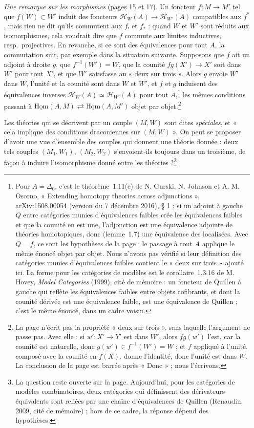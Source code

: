 \documentclass[11pt,a4paper]{article}
\begin{document}
\emph{Une remarque sur les morphismes} (pages 15 et 17). Un foncteur $f : M \to
M'$ tel que $f(W) \subset W'$ induit des foncteurs $\mathcal H_W(A) \to
\mathcal H_{W'}(A)$ compatibles aux $f^{*}$, mais rien ne dit qu'ils
commutent aux $f_{!}$ et $f_{*}$ : quand $W$ et $W'$ sont réduits aux
isomorphismes, cela voudrait dire que $f$ commute aux limites inductives,
resp.\ projectives. En revanche, si ce sont des équivalences pour tout $A$,
la commutation suit, par exemple dans la situation suivante. Supposons que $f$ ait un adjoint à
droite $g$, que $f^{-1}(W') = W$, que la counité $fg(X') \to X'$ soit dans
$W'$ pour tout $X'$, et que $W'$ satisfasse au « deux sur trois ». Alors $g$
envoie $W'$ dans $W$, l'unité et la counité sont dans $W$ et $W'$, et $f$ et
$g$ induisent des équivalences inverses $\mathcal H_W(A) \simeq
\mathcal H_{W'}(A)$ pour tout $A$,\footnote{Pour $A = \Delta_0$, c'est le
théorème~1.11(c) de N. Gurski, N. Johnson et A. M. Osorno, « Extending
homotopy theories across adjunctions », arXiv:1508.00054 (version du 7
décembre 2016), § 1 : si un adjoint à gauche $Q$ entre catégories munies
d'équivalences faibles crée les équivalences faibles et que la counité en est
une, l'adjonction est une équivalence adjointe de théories homotopiques,
donc (lemme~1.7) une équivalence des localisées. Avec $Q = f$, ce sont les
hypothèses de la page ; le passage à tout $A$ applique le même énoncé objet
par objet. Nous n'avons pas vérifié si leur définition des catégories munies
d'équivalences faibles contient le « deux sur trois » ajouté ici. La forme
pour les catégories de modèles est le corollaire~1.3.16 de M. Hovey,
\emph{Model Categories} (1999), cité de mémoire : un foncteur de Quillen à
gauche qui reflète les équivalences faibles entre objets cofibrants, et dont
la counité dérivée est une équivalence faible, est une équivalence de
Quillen ; c'est le même énoncé, dans un cadre voisin.} les mêmes conditions passant à
$\underline{\mathrm{Hom}}(A, M) \rightleftarrows \underline{\mathrm{Hom}}(A,
M')$ objet par objet.\footnote{La page n'écrit pas la propriété « deux sur
trois », sans laquelle l'argument ne passe pas. Avec elle : si $w' : X' \to
Y'$ est dans $W'$, alors $fg(w')$ l'est, car la counité est naturelle, donc
$g(w') \in f^{-1}(W') = W$ ; et $f$ appliqué à l'unité, composé avec la
counité en $f(X)$, donne l'identité, donc l'unité est dans $W$. La
conclusion de la page est barrée après « Donc » ; nous l'écrivons.}

Les théories qui se décrivent par un couple $(M, W)$ sont dites
\emph{spéciales}, et « cela implique des conditions draconiennes sur $(M,
W)$ ». On peut se proposer d'avoir une vue d'ensemble des couples qui
donnent une théorie donnée : deux tels couples $(M_1, W_1)$, $(M_2, W_2)$
s'envoient-ils toujours dans un troisième, de façon à induire l'isomorphisme
donné entre les théories ?\footnote{La question reste ouverte sur la page.
Aujourd'hui, pour les catégories de modèles combinatoires, deux catégories
qui définissent des dérivateurs équivalents sont reliées par une chaîne
d'équivalences de Quillen (Renaudin, 2009, cité de mémoire) ; hors de ce
cadre, la réponse dépend des hypothèses.}
\end{document}
